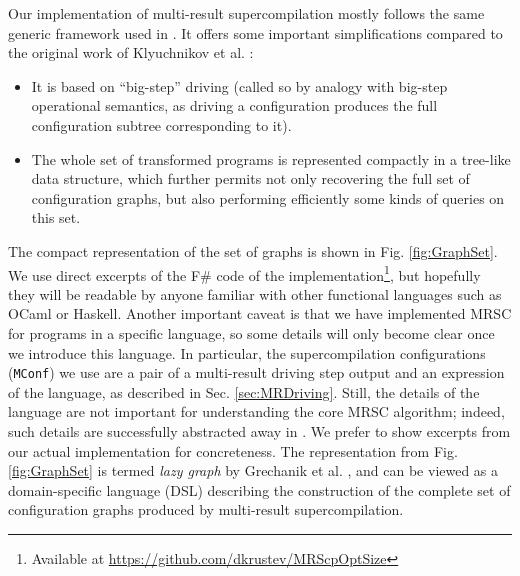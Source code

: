 \documentclass[submission,copyright,creativecommons]{eptcs}
\begin{document}
Our implementation of multi-result supercompilation mostly follows the same
generic framework used in \cite{Romanenko2014StagedMRSC,krustev2014approach}.
It offers some important simplifications compared to the original work
of Klyuchnikov et al. \cite{KlyuchnikovMRSCBranch,Klyuchnikov:META2012:MRSC}:
\begin{itemize}
  \item It is based on ``big-step'' driving (called so by analogy with big-step
    operational semantics, as driving a configuration produces
    the full configuration subtree corresponding to it).
  \item The whole set of transformed programs is represented compactly
    in a tree-like data structure, which further permits not only
    recovering the full set of configuration graphs, but also
    performing efficiently some kinds of queries on this set.
\end{itemize}
The compact representation of the set of graphs is shown in Fig. \ref{fig:GraphSet}.
We use direct excerpts of the F\# code of the implementation\footnote{Available at
\url{https://github.com/dkrustev/MRScpOptSize}}, but hopefully
they will be readable by anyone familiar with other functional languages such as OCaml or Haskell.
Another important caveat is that we have implemented MRSC for programs in a specific language,
so some details will only become clear once we introduce this language.
In particular, the supercompilation configurations (\verb|MConf|) we use are 
a pair of a multi-result driving step output and an expression of the language,
as described in Sec. \ref{sec:MRDriving}.
Still, the details of the language are not important for understanding the core
MRSC algorithm; indeed, such details are successfully abstracted away in \cite{Romanenko2014StagedMRSC,krustev2014approach}.
We prefer to show excerpts from our actual implementation for concreteness.
The representation from Fig. \ref{fig:GraphSet} is termed \emph{lazy graph} by Grechanik et al. \cite{Romanenko2014StagedMRSC},
and can be viewed as a domain-specific language (DSL) describing the construction of the
complete set of configuration graphs produced by multi-result supercompilation.
\end{document}
